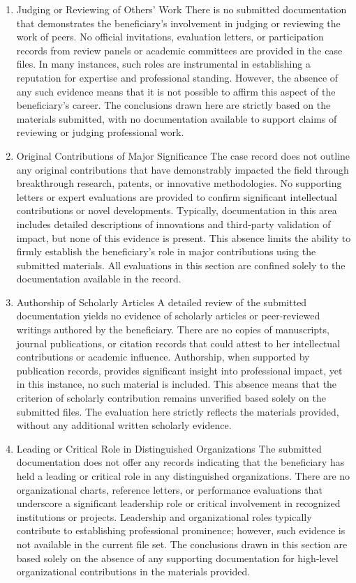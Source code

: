 \begin{enumerate}
\item Judging or Reviewing of Others’ Work
There is no submitted documentation that demonstrates the beneficiary’s involvement in judging or reviewing the work of peers. No official invitations, evaluation letters, or participation records from review panels or academic committees are provided in the case files. In many instances, such roles are instrumental in establishing a reputation for expertise and professional standing. However, the absence of any such evidence means that it is not possible to affirm this aspect of the beneficiary’s career. The conclusions drawn here are strictly based on the materials submitted, with no documentation available to support claims of reviewing or judging professional work.

\item Original Contributions of Major Significance
The case record does not outline any original contributions that have demonstrably impacted the field through breakthrough research, patents, or innovative methodologies. No supporting letters or expert evaluations are provided to confirm significant intellectual contributions or novel developments. Typically, documentation in this area includes detailed descriptions of innovations and third-party validation of impact, but none of this evidence is present. This absence limits the ability to firmly establish the beneficiary’s role in major contributions using the submitted materials. All evaluations in this section are confined solely to the documentation available in the record.

\item Authorship of Scholarly Articles
A detailed review of the submitted documentation yields no evidence of scholarly articles or peer‑reviewed writings authored by the beneficiary. There are no copies of manuscripts, journal publications, or citation records that could attest to her intellectual contributions or academic influence. Authorship, when supported by publication records, provides significant insight into professional impact, yet in this instance, no such material is included. This absence means that the criterion of scholarly contribution remains unverified based solely on the submitted files. The evaluation here strictly reflects the materials provided, without any additional written scholarly evidence.

\item Leading or Critical Role in Distinguished Organizations
The submitted documentation does not offer any records indicating that the beneficiary has held a leading or critical role in any distinguished organizations. There are no organizational charts, reference letters, or performance evaluations that underscore a significant leadership role or critical involvement in recognized institutions or projects. Leadership and organizational roles typically contribute to establishing professional prominence; however, such evidence is not available in the current file set. The conclusions drawn in this section are based solely on the absence of any supporting documentation for high‑level organizational contributions in the materials provided.


\end{enumerate}
